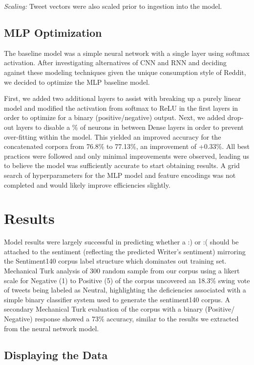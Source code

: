 \documentclass[11pt]{article}
\begin{document}
\textit{Scaling:} Tweet vectors were also scaled prior to ingestion into the model. 


\subsection{MLP Optimization}

The baseline model was a simple neural network with a single layer using 
softmax activation. After investigating alternatives of CNN and RNN and deciding 
against these modeling techniques given the unique consumption style of Reddit, we 
decided to optimize the MLP baseline model.

First, we added two additional layers to assist with breaking up a purely linear model 
and modified the activation from softmax to ReLU in the first layers in order to 
optimize for a binary 
(positive/negative) output. Next, we added drop-out layers to disable a \% of neurons 
in between Dense layers in order to prevent over-fitting within the model. This yielded an 
improved accuracy for the concatenated corpora 
from 76.8\% to 77.13\%, an improvement of +0.33\%. All best practices were followed 
and only minimal improvements were observed, leading us to believe the model was 
sufficiently accurate to start obtaining results. A grid search of hyperparameters for the MLP model and feature encodings was not completed and would likely improve efficiencies slightly.

\section{Results}

Model results were largely successful in predicting whether a :) or 
:( should be attached to the sentiment (reflecting the predicted Writer's sentiment) 
mirroring the Sentiment140 corpus label structure which dominates out training set. 
Mechanical Turk analysis of 300 random sample from our corpus using a likert scale 
for Negative (1) to Positive (5) of the corpus uncovered an 18.3\% 
swing vote of tweets being labeled as Neutral, highlighting the deficiencies 
associated with a simple binary classifier system used to generate the 
sentiment140 corpus. A secondary Mechanical Turk evaluation of the corpus with a 
binary (Positive/ Negative) response showed a 73\% accuracy, similar to the results we 
extracted from the neural network model. 

\subsection{Displaying the Data}
\end{document}
